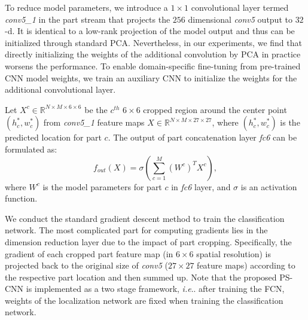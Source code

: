 \documentclass[10pt,twocolumn,letterpaper]{article}
\makeatletter
\DeclareRobustCommand\onedot{\futurelet\@let@token\@onedot}
\def\@onedot{\ifx\@let@token.\else.\null\fi\xspace}
\def\ie{\emph{i.e}\onedot} \def\Ie{\emph{I.e}\onedot}
\makeatother
\begin{document}
To reduce model parameters, we introduce a $1\times1$ convolutional layer termed \textit{conv5\_1} in the part stream that projects the $256$ dimensional \textit{conv5} output to $32$-d. It is identical to a low-rank projection of the model output and thus can be initialized through standard PCA. Nevertheless, in our experiments, we find that directly initializing the weights of the additional convolution by PCA in practice worsens the performance. To enable domain-specific fine-tuning from pre-trained CNN model weights, we train an auxiliary CNN to initialize the weights for the additional convolutional layer.

Let $X^c\in \mathbb{R}^{N\times M\times 6\times6}$ be the $c^{th}$ $6\times6$ cropped region around the center point $(h^*_c,w^*_c)$ from \textit{conv5\_1} feature maps $X \in \mathbb{R}^{N\times M\times27\times27}$, where $(h^*_c, w^*_c)$ is the predicted location for part $c$. The output of part concatenation layer \emph{fc6} can be formulated as:
\begin{equation}
f_{out}(X) = \sigma(\sum_{c=1}^{M} (W^c)^TX^c),
\end{equation}
where $W^c$ is the model parameters for part $c$ in \emph{fc6} layer, and $\sigma$ is an activation function.




\iffalse
We conduct the standard gradient descent to train the classification network. It should be noted, however, that the gradient of each element $\frac{\partial E}{\partial X_{i,j}}$ in \textit{conv5\_1} feature maps is calculated by the following equation:
\begin{equation}
\frac{\partial E}{\partial X_{i,j}} = \sum_{c=1}^M \phi (\frac{\partial E}{\partial X^c_{i,j}}),
\end{equation}
where $E$ is the loss function and
\begin{equation}
\phi (\frac{\partial E}{\partial X^c_{i,j}})=
\begin{cases}
\frac{\partial E}{\partial X^c_{i,j}} &\mbox{$X_{i,j}$ corresponding to  $X^c_{i,j}$},  \\
0 &\mbox{otherwise}.
\end{cases}
\end{equation}
The computation of all other layers simply follows the standard gradient rules.
\fi


We conduct the standard gradient descent method to train the classification network. The most complicated part for computing gradients lies in the dimension reduction layer due to the impact of part cropping. Specifically, the gradient of each cropped part feature map (in $6\times 6$ spatial resolution) is projected back to the original size of \textit{conv5} ($27\times27$ feature maps) according to the respective part location and then summed up.
Note that the proposed PS-CNN is implemented as a two stage framework, \ie after training the FCN, weights of the localization network are fixed when training the classification network.
\end{document}
